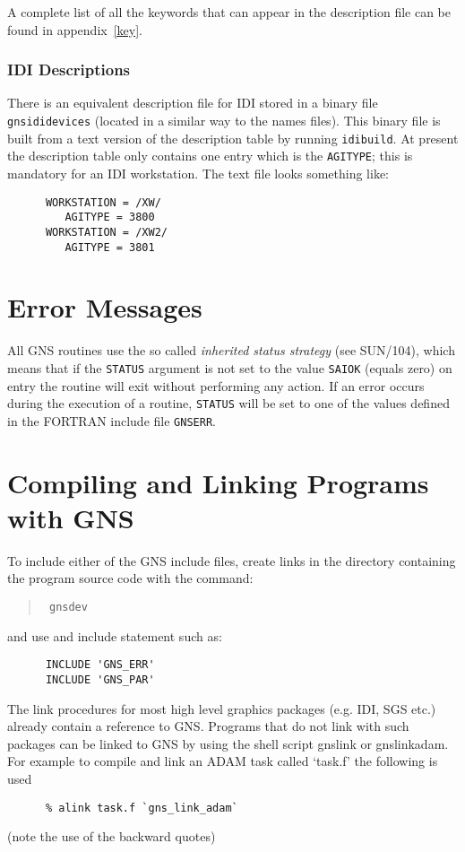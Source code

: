 \documentclass[twoside,11pt]{article}
\newcommand{\hyperref}[4]{#2\ref{#4}#3}
\newcommand{\xref}[3]{#1}
\renewcommand{\_}{\texttt{\symbol{95}}}
\begin{document}
A complete list of all the keywords that can appear in the description file
can be found in \hyperref{this appendix}{appendix~}{}{key}.

\subsubsection{IDI Descriptions}

There is an equivalent description file for IDI stored in a binary file
{\tt gns\_ididevices} (located in a similar way to the names files).
This binary file is built from a text version of the description table by
running {\tt idibuild}. At present the description table only
contains one entry which is the {\tt AGITYPE}; this is mandatory for an IDI
workstation. The text file looks something like:

\begin{verbatim}
      WORKSTATION = /XW/
         AGITYPE = 3800
      WORKSTATION = /XW2/
         AGITYPE = 3801
\end{verbatim}

\section{Error Messages}\label{er}

All GNS routines use the so called {\em inherited status strategy}
(see \xref{SUN/104}{sun104}{}), which means
that if the {\tt STATUS} argument is not set to the value {\tt SAI\_\_OK}
(equals zero) on entry the routine will exit without performing any action. If
an error occurs during the execution of a routine, {\tt STATUS} will be set to
one of the values defined in the FORTRAN include file {\tt GNS\_ERR}.

\section{Compiling and Linking Programs with GNS}\label{cl}

To include either of the GNS include files, create links in the directory
containing the program source code with the command:
\begin{quote}{\tt
gns\_dev}
\end{quote}
and use and include statement such as:
\begin{verbatim}
      INCLUDE 'GNS_ERR'
      INCLUDE 'GNS_PAR'
\end{verbatim}

The link procedures for most high level graphics packages (e.g. IDI, SGS etc.)
already contain a reference to GNS. Programs that do not link with such
packages can be linked to GNS by using the shell script gns\_link
or gns\_link\_adam. For example to compile and link an ADAM task called
`task.f' the following is used
\begin{verbatim}
      % alink task.f `gns_link_adam`
\end{verbatim}
(note the use of the backward quotes)
\end{document}
